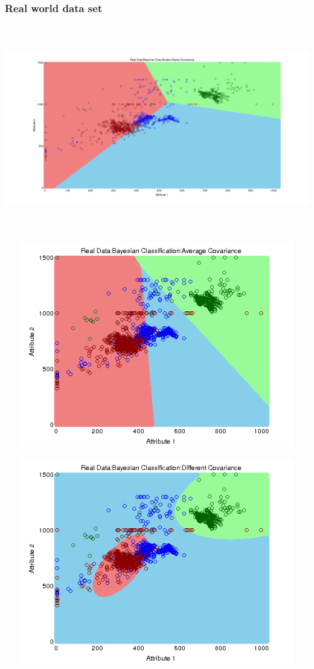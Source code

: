\documentclass[a4paper]{article}
\begin{document}
		\subsubsection{Real world data set}
			\centerline{\includegraphics[width=160mm,height=90mm]{plots/bayes/real/same_cov.png}}
 			\centerline{\includegraphics[width=160mm,height=90mm]{plots/bayes/real/avg_cov.png}}
 			\centerline{\includegraphics[width=160mm,height=90mm]{plots/bayes/real/diff_cov.png}}
\end{document}
